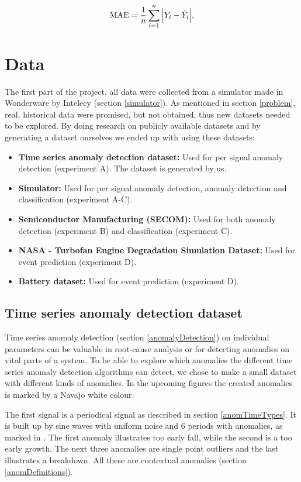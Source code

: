 \documentclass[english, a4paper]{report}
\begin{document}
{{{{                \begin{equation}\label{mae-eq}
                    \text{MAE} = \frac{1}{n} \sum_{i=1}^{n} \abs{Y_{i}-\hat{Y}_{i}}, 
                \end{equation}
            }
        }
    }
    
    \section{Data}
    {
        The first part of the project, all data were collected from a simulator made in Wonderware by Intelecy (section \ref{simulator}). As mentioned in section \ref{problem}, real, historical data were promised, but not obtained, thus new datasets needed to be explored. By doing research on publicly available datasets and by generating a dataset ourselves we ended up with using these datasets:
        \begin{itemize}
            \item \textbf{Time series anomaly detection dataset:} Used for per signal anomaly detection (experiment A). The dataset is generated by us.
            \item \textbf{Simulator:} Used for per signal anomaly detection, anomaly detection and classification (experiment A-C).
            \item \textbf{Semiconductor Manufacturing (SECOM):} Used for both anomaly detection (experiment B) and classification (experiment C).
            \item \textbf{NASA - Turbofan Engine Degradation Simulation Dataset:} Used for event prediction (experiment D).
            \item \textbf{Battery dataset:} Used for event prediction (experiment D).
        \end{itemize}
        
        \subsection{Time series anomaly detection dataset}\label{timeSeriesData}
        {
            Time series anomaly detection (section \ref{anomalyDetection}) on individual parameters can be valuable in root-cause analysis or for detecting anomalies on vital parts of a system. To be able to explore which anomalies the different time series anomaly detection algorithms can detect, we chose to make a small dataset with different kinds of anomalies. In the upcoming figures the created anomalies is marked by a Navajo white colour. 
            \par
            The first signal is a periodical signal as described in section \ref{anomTimeTypes}. It is built up by sine waves with uniform noise and 6 periods with anomalies, as marked in . The first anomaly illustrates too early fall, while the second is a too early growth. The next three anomalies are single point outliers and the last illustrates a breakdown. All these are contextual anomalies (section \ref{anomDefinitions}).
            
}}}
\end{document}
